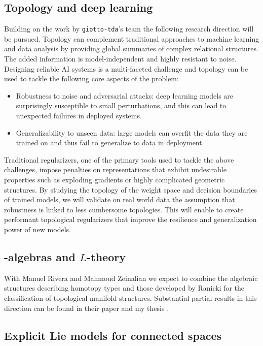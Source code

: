 \subsection{Topology and deep learning}

Building on the work by \texttt{giotto-tda}'s team the following research direction will be pursued.
Topology can complement traditional approaches to machine learning and data analysis by providing global summaries of complex relational structures.
The added information is model-independent and highly resistant to noise.
Designing reliable AI systems is a multi-faceted challenge and topology can be used to tackle the following core aspects of the problem:
\begin{itemize}
	\item Robustness to noise and adversarial attacks: deep learning models are surprisingly susceptible to small perturbations, and this can lead to unexpected failures in deployed systems.
	\item Generalizability to unseen data: large models can overfit the data they are trained on and thus fail to generalize to data in deployment.
\end{itemize}
Traditional regularizers, one of the primary tools used to tackle the above challenges, impose penalties on representations that exhibit undesirable properties such as exploding gradients or highly complicated geometric structures.
By studying the topology of the weight space and decision boundaries of trained models, we will validate on real world data the assumption that robustness is linked to less cumbersome topologies.
This will enable to create performant topological regularizers that improve the resilience and generalization power of new models.

\subsection{\pdfEinfty-algebras and $L$-theory}

With Manuel Rivera and Mahmoud Zeinalian we expect to combine the algebraic structures describing homotopy types \cite{sullivan1977infinitesimal, mandell2001padic} and those developed by Ranicki \cite{ranicki1992topological} for the classification of topological manifold structures.
Substantial partial results in this direction can be found in their paper \cite{rivera2018rigidification} and my thesis \cite{medina2015thesis}.

\subsection{Explicit Lie models for connected spaces}

